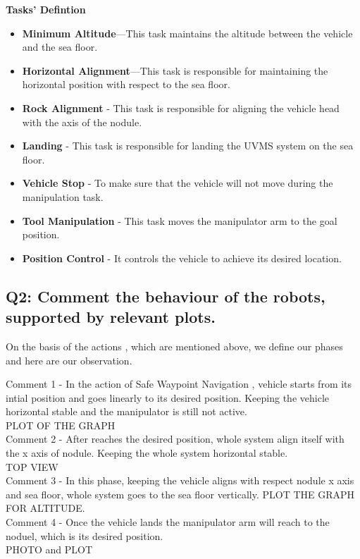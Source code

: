 \documentclass{article}
\begin{document}
\noindent
\textbf{Tasks' Defintion}
\begin{itemize}
	\item \textbf{Minimum Altitude}—This task maintains the altitude between the vehicle and the sea floor.
	\item \textbf{Horizontal Alignment}—This task is responsible for maintaining the horizontal position with respect to the sea floor. 
	\item \textbf{Rock Alignment} - This task is responsible for aligning the vehicle head with the axis of the nodule. 
	\item \textbf{Landing} - This task is responsible for landing the UVMS system on the sea floor. 
	\item \textbf{Vehicle Stop} - To make sure that the vehicle will not move during the manipulation task. 
	\item \textbf{Tool Manipulation} - This task moves the manipulator arm to the goal position.
	\item \textbf{Position Control} - It controls the vehicle to achieve its desired location.
\end{itemize}




\subsection{Q2: Comment the behaviour of the robots, supported by relevant plots.}
On the basis of the actions , which are mentioned above, we define our phases and here are our observation. 

Comment 1 - In the action of Safe Waypoint Navigation , vehicle starts from its intial position and goes linearly to its desired position. Keeping the vehicle horizontal stable and the manipulator is still not active. \\
PLOT OF THE GRAPH\\
Comment 2 - After reaches the desired position, whole system align itself with the x axis of nodule. Keeping the whole system horizontal stable.  \\
TOP VIEW\\
Comment 3 - In this phase, keeping the vehicle aligns with respect nodule x axis and sea floor, whole system goes to the sea floor vertically. 
PLOT THE GRAPH FOR ALTITUDE.\\
Comment 4 - Once the vehicle lands the manipulator arm will reach to the noduel, which is its desired position. 
\\PHOTO and PLOT
\end{document}
